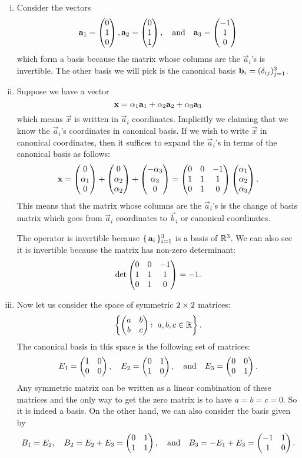 \documentclass[12pt]{memoir}
\begin{document}
\begin{ptcbr}
    \begin{enumerate}[(i)]
        \item Consider the vectors 
        $$\mathbf{a}_1=\begin{pmatrix} 0 \\ 1 \\ 0 \end{pmatrix},\mathbf{a}_2=\begin{pmatrix} 0 \\ 1 \\ 1 \end{pmatrix},\quad\text{and}\quad\mathbf{a}_3=\begin{pmatrix} -1 \\ 1 \\ 0 \end{pmatrix}$$
        which form a basis because the matrix whose columns are the $\vec a_i$'s is invertible. The other basis we will pick is the canonical basis $\mathbf{b}_i=(\delta_{ij})_{j=1}^3$.
        \item Suppose we have a vector 
        $$\mathbf{x}=\alpha_1\mathbf{a}_1+\alpha_2\mathbf{a}_2+\alpha_3\mathbf{a}_3$$
        which means $\vec x$ is written in $\vec a_i$ coordinates. Implicitly we claiming that we know the $\vec a_i$'s coordinates in canonical basis. If we wish to write $\vec x$ in canonical coordinates, then it suffices to expand the $\vec a_i$'s in terms of the canonical basis as follows:
        $$\mathbf{x}=\begin{pmatrix} 0 \\ \alpha_1 \\ 0 \end{pmatrix}+\begin{pmatrix} 0 \\ \alpha_2 \\ \alpha_2 \end{pmatrix}+\begin{pmatrix} -\alpha_3 \\ \alpha_3 \\ 0 \end{pmatrix}=\begin{pmatrix} 0 & 0 & -1 \\ 1 & 1 & 1 \\ 0 & 1 & 0 \end{pmatrix}\begin{pmatrix} \alpha_1 \\ \alpha_2 \\ \alpha_3 \end{pmatrix}.$$
        This means that the matrix whose columns are the $\vec a_i$'s is the change of basis matrix which goes from $\vec a_i$ coordinates to $\vec b_i$ or canonical coordinates.\par 
        The operator is invertible because $\{\,\mathbf{a}_i\,\}_{i=1}^3$ is a basis of $\mathbb{R}^3$. We can also see it is invertible because the matrix has non-zero determinant:
        $$\det\begin{pmatrix} 0 & 0 & -1 \\ 1 & 1 & 1 \\ 0 & 1 & 0 \end{pmatrix}=-1.$$
        \item Now let us consider the space of symmetric $2\times2$ matrices:
        $$\left\lbrace\twobytwo{a}{b}{b}{c}\:\ a,b,c\in\bR\right\rbrace.$$
        The canonical basis in this space is the following set of matrices:
        $$E_1=\begin{pmatrix} 1 & 0 \\ 0 & 0 \end{pmatrix},\quad E_2=\begin{pmatrix} 0 & 1 \\ 1 & 0 \end{pmatrix},\quad\text{and}\quad E_3=\begin{pmatrix} 0 & 0 \\ 0 & 1 \end{pmatrix}.$$
        Any symmetric matrix can be written as a linear combination of these matrices and the only way to get the zero matrix is to have $a=b=c=0$. So it is indeed a basis. On the other hand, we can also consider the basis given by 
        $$B_1=E_2,\quad B_2=E_2+E_3=\begin{pmatrix} 0 & 1 \\ 1 & 1 \end{pmatrix},\quad\text{and}\quad B_3=-E_1+E_3=\begin{pmatrix} -1 & 1 \\ 1 & 0 \end{pmatrix}.$$
    \end{enumerate}
\end{ptcbr}
\end{document}
